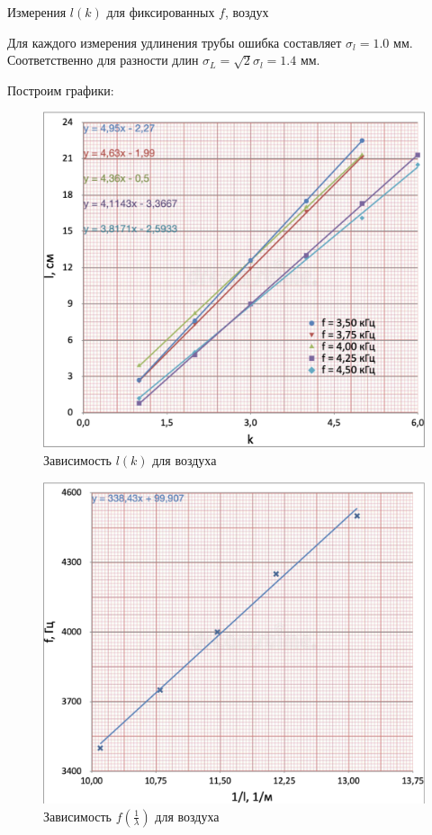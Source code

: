\documentclass[12pt,a4paper]{article}
\begin{document}
\begin{table}[H]
	\caption{Измерения $l(k)$ для фиксированных $f$, воздух}
	
\end{table}

Для каждого измерения удлинения трубы ошибка составляет $\sigma_l = 1.0$ мм.
Соответственно для разности длин $\sigma_L = \sqrt{2} \sigma_l = 1.4$ мм.

Построим графики:

\begin{figure}[H]
	\includegraphics[width = 10.6 cm]{src/l(k)air.pdf}
	\caption{Зависимость $l(k)$ для воздуха}
	\label{fig:lka}
\end{figure}

\begin{figure}[H]
	\includegraphics[width = 10.6 cm]{src/f(1_l)air.pdf}
	\caption{Зависимость $f(\frac{1}{\lambda})$ для воздуха}
	\label{fig:fla}
\end{figure}
\end{document}
